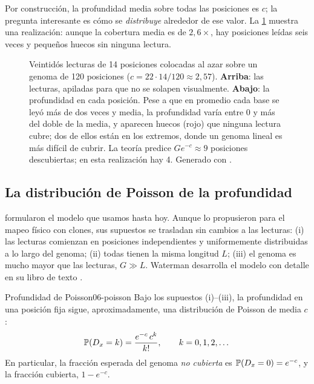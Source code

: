\begin{simbolos}
\end{simbolos}

Por construcción, la profundidad media sobre todas las posiciones es $c$; la pregunta interesante es cómo se \emph{distribuye} alrededor de ese valor. La \cref{fig:06-lecturas} muestra una realización: aunque la cobertura media es de $2{,}6\times$, hay posiciones leídas seis veces y pequeños huecos sin ninguna lectura.

\begin{figure}[t]
\centering

\caption[Lecturas aleatorias y perfil de profundidad]{Veintidós lecturas de 14 posiciones colocadas al azar sobre un genoma de 120 posiciones ($c = 22\cdot14/120 \approx 2{,}57$). \textbf{Arriba}: las lecturas, apiladas para que no se solapen visualmente. \textbf{Abajo}: la profundidad en cada posición. Pese a que en promedio cada base se leyó más de dos veces y media, la profundidad varía entre 0 y más del doble de la media, y aparecen huecos (rojo) que ninguna lectura cubre; dos de ellos están en los extremos, donde un genoma lineal es más difícil de cubrir. La teoría predice $G e^{-c}\approx 9$ posiciones descubiertas; en esta realización hay 4. Generado con .}
\label{fig:06-lecturas}
\end{figure}

\subsection{La distribución de Poisson de la profundidad}

\textcite{c06-lander1988} formularon el modelo que usamos hasta hoy. Aunque lo propusieron para el mapeo físico con clones, sus supuestos se trasladan sin cambios a las lecturas: (i) las lecturas comienzan en posiciones independientes y uniformemente distribuidas a lo largo del genoma; (ii) todas tienen la misma longitud $L$; (iii) el genoma es mucho mayor que las lecturas, $G\gg L$. Waterman desarrolla el modelo con detalle en su libro de texto \parencite{c06-waterman1995}.

\begin{teorema}{Profundidad de Poisson}{06-poisson}
Bajo los supuestos (i)--(iii), la profundidad en una posición fija sigue, aproximadamente, una distribución de Poisson de media $c$:
\begin{equation}\label{eq:06-poisson}
\mathbb{P}(D_x = k) = \frac{e^{-c}\,c^{k}}{k!},\qquad k=0,1,2,\dots
\end{equation}
En particular, la fracción esperada del genoma \emph{no cubierta} es $\mathbb{P}(D_x=0)=e^{-c}$, y la fracción cubierta, $1-e^{-c}$.
\end{teorema}

